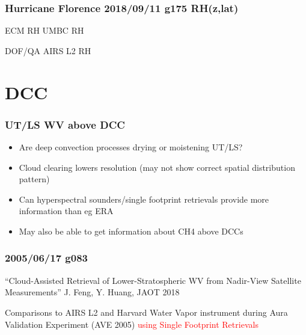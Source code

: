 \documentclass[10pt,t]{beamer}
\begin{document}
\begin{frame}
  \frametitle{Hurricane Florence 2018/09/11 g175 RH(z,lat)}

\vspace{-0.15in}  
  \footnotesize ECM RH  \hspace{2.0in} \footnotesize UMBC RH\\
\vspace{-0.01in}    
  \begin{center}
  \end{center}

\vspace{-0.15in}  
  \footnotesize DOF/QA \hspace{2.0in} \footnotesize AIRS L2 RH\\
\vspace{-0.01in}    
  \begin{center}
  \end{center}

\end{frame}
\section{DCC}

\begin{frame}
  \frametitle{UT/LS WV above DCC}
\begin{itemize}
  \item Are deep convection processes drying or moistening UT/LS?
  \item Cloud clearing lowers resolution (may not show correct spatial distribution pattern)
  \item Can hyperspectral sounders/single footprint retrievals provide more information than eg ERA
  \item May also be able to get information about CH4 above DCCs
\end{itemize}
\end{frame}

\begin{frame}
  \frametitle{2005/06/17 g083}
  ``Cloud-Assisted Retrieval of Lower-Stratospheric WV from Nadir-View Satellite
    Measurements''  J. Feng, Y. Huang, JAOT 2018

\begin{small}
Comparisons to  AIRS L2 and Harvard Water Vapor instrument during Aura
Validation Experiment (AVE 2005) \textcolor{red}{using Single Footprint Retrievals}
\end{small}


\end{frame}
\end{document}
